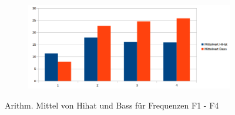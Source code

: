 \begin{table}[H]
\begin{tabular}{l c c c c | l c c c c}
%
%
%
%
%
%
		

	\end{tabular}
	\label{tab:FFT}
\end{table}

\begin{figure}[H]
\centering
\begin{subfigure}{.5\textwidth}
		\includegraphics[scale=0.5]{figures/Mittelwert_2.png}
\end{subfigure}
\caption{Arithm. Mittel von Hihat und Bass für Frequenzen F1 - F4}
\label{fig:FFT_Mittelwerte}
\end{figure}


